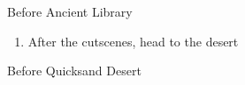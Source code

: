 \begin{paracol}{2}
\begin{steproute}{Before Ancient Library}
\end{steproute}

\switchcolumn*
\begin{enumerate}[resume]
    \item After the cutscenes, head to the desert
\end{enumerate}

\switchcolumn
\begin{steproute}{Before Quicksand Desert}
\end{steproute}

\end{paracol}